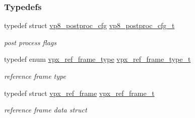 \subsubsection*{Typedefs}
\begin{DoxyCompactItemize}
\item 
typedef struct \hyperlink{structvp8__postproc__cfg}{vp8\-\_\-postproc\-\_\-cfg} \hyperlink{group__vp8_ga7e9e955211711b2f915bc59640cc0ef0}{vp8\-\_\-postproc\-\_\-cfg\-\_\-t}
\begin{DoxyCompactList}\small\item\em post process flags \end{DoxyCompactList}\item 
typedef enum \hyperlink{group__vp8_gad8ab72d8a178a68339dad2987358c331}{vpx\-\_\-ref\-\_\-frame\-\_\-type} \hyperlink{group__vp8_ga75ac0689a81bf7202382a225c5b451b4}{vpx\-\_\-ref\-\_\-frame\-\_\-type\-\_\-t}
\begin{DoxyCompactList}\small\item\em reference frame type \end{DoxyCompactList}\item 
typedef struct \hyperlink{structvpx__ref__frame}{vpx\-\_\-ref\-\_\-frame} \hyperlink{group__vp8_ga9157c53799cdafd12ebee65d04e16825}{vpx\-\_\-ref\-\_\-frame\-\_\-t}
\begin{DoxyCompactList}\small\item\em reference frame data struct \end{DoxyCompactList}\end{DoxyCompactItemize}
